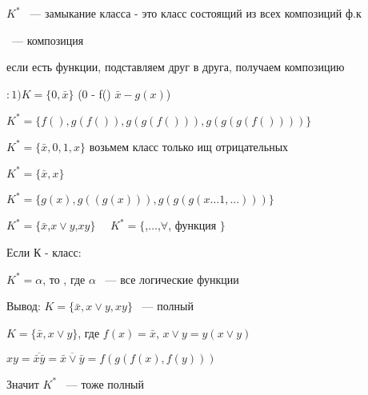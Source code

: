 \documentclass[russian]{lecture-notes}
\begin{document}
			$K^{*}$ ~--- замыкание класса - это класс состоящий из всех композиций ф.к


			 ~--- композиция

			если есть функции, подставляем друг в друга, получаем композицию

	\begin{example}
		$:1) K = \{0,\bar{x}\}$ \quad (0 - f() $\bar{x} - g(x)$)

		$K^{*} = \{ f(), g(f()), g(g(f())), g(g(g(f())))\}$
\end{example}
	\begin{example}
		$K^{*} = \{\bar{x},0,1,x\}$ возьмем класс только ищ отрицательных

		$K^{*} = \{ \bar{x}, x\}$

		$K^{*} = \{ g(x), g((g(x))), g(g(g(x \dots 1, \dots )))\}$
\end{example}
	\begin{example}
		$K^{*}=\{ \bar{x}$,$ x \lor y$,$ xy \}$  $\quad K^{*} = \{ $,$ \dots$,$ \forall$, функция $\}$
	\end{example}

	\begin{definition}

		Если К - класс:

		$K^{*} = \alpha$, то , где $\alpha$ ~--- все логические функции

		Вывод: $K = \{ \bar{x}, x \lor y, xy\}$ ~--- полный

		\end{definition}
		\begin{example}

			$K = \{\bar{x}, x \lor y \}$, где $f(x) = \bar{x}$, $x \lor y = y(x\lor y)$
		\end{example}
		
		$xy = \overline{\bar{x}\bar{y}} = \overline{\bar{x} \lor \bar{y}} 
		 = f(g(f(x),f(y)))$  %

		Значит $K^{*}$ ~--- тоже полный
		
%
%
%
%
%
%
%
%
\end{document}

